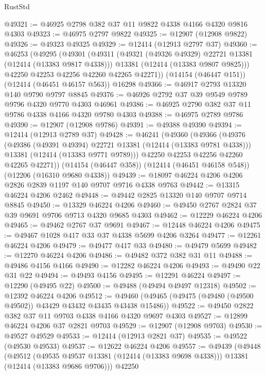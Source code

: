 \begin{lexlean}{RustStd}
\begin{coremodule}
{\begin{coremodule}
{{{{{{{{{{{{{{{{{{{{{{{{{{{{{{{{{{{{{{{{{{{{{{{{{{@49321 := @46925 @2798 @382 @37 @11 @9822 @4338 @4166 @4320 @9816 @4303
@49323 := @46975 @2797 @9822
@49325 := @12907 (@12908 @9822)
@49326 := @49323 @49325
@49329 := @12414 (@12913 @2797 @37)
@49360 := @46253
    (@49295
      (@49301
        (@49311
          (@49321 (@49326 @49329) @22721 @13381 (@12414 (@13383 @9817 @4338)))
          @13381
          (@12414 (@13383 @9807 @9825)))
        @42250
        @42253
        @42256
        @42260
        @42265
        @42271))
    (@14154 (@46447 @151))
    (@12414 (@46451 @46157 @563))
    @16298
@49366 := @46917 @2793 @13320 @140 @9790 @9797 @8845
@49376 := @46926 @2792 @37 @39 @9549 @9789 @9796 @4320 @9770 @4303 @46961
@49386 := @46925 @2790 @382 @37 @11 @9786 @4338 @4166 @4320 @9780 @4303
@49388 := @46975 @2789 @9786
@49390 := @12907 (@12908 @9786)
@49391 := @49388 @49390
@49394 := @12414 (@12913 @2789 @37)
@49428 := @46241
    (@49360
      (@49366
        (@49376
          (@49386 (@49391 @49394) @22721 @13381 (@12414 (@13383 @9781 @4338)))
          @13381
          (@12414 (@13383 @9771 @9789)))
        @42250
        @42253
        @42256
        @42260
        @42265
        @42271))
    (@14154 (@46447 @358))
    (@12414 (@46451 @46158 @548))
    (@12206 (@16310 @9680 @4338))
@49439 := @18097 @46224 @4206 @4206 @2826 @2839 @1197 @140 @9707 @9716 @4338 @9763
@49442 := @13315 @46224 @4206 @2462
@49448 := @49442 @2825 @13320 @140 @9707 @9714 @8845
@49450 := @13329 @46224 @4206
@49460 := @49450 @2767 @2824 @37 @39 @9691 @9706 @9713 @4320 @9685 @4303
@49462 := @12229 @46224 @4206
@49465 := @49462 @2767 @37 @9691
@49467 := @12448 @46224 @4206
@49475 := @49467 @1028 @417 @33 @37 @4338 @5699 @4206 @3264
@49477 := @12261 @46224 @4206
@49479 := @49477 @417 @33
@49480 := @49479 @5699
@49482 := @12270 @46224 @4206
@49486 := @49482 @372 @382 @31 @11
@49488 := @49486 @4156 @4166
@49490 := @12282 @46224 @4206
@49493 := @49490 @22 @31 @22
@49494 := @49493 @4156
@49495 := @12291 @46224
@49497 := @12290 (@49495 @22)
@49500 := @49488 (@49494 @49497 @12318)
@49502 := @12392 @46224 @4206
@49512 := @49460 (@49465 (@49475 (@49480 (@49500 @49502)) @43429 @43432 @43435 @43438 @15486))
@49522 := @49450 @2822 @382 @37 @11 @9703 @4338 @4166 @4320 @9697 @4303
@49527 := @12899 @46224 @4206 @37 @2821 @9703
@49529 := @12907 (@12908 @9703)
@49530 := @49527 @49529
@49533 := @12414 (@12913 @2821 @37)
@49535 := @49522 (@49530 @49533)
@49537 := @12622 @46224 @4206
@49557 := @49439
    (@49448
      (@49512
        (@49535 @49537 @13381 (@12414 (@13383 @9698 @4338)))
        @13381
        (@12414 (@13383 @9686 @9706)))
      @42250
}}}}}}}}}}}}}}}}}}}}}}}}}}}}}}}}}}}}}}}}}}}}}}}}}}
\end{coremodule}}
\end{coremodule}
\end{lexlean}
